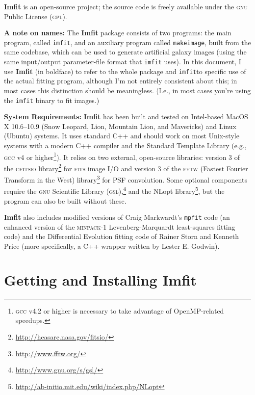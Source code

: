 \documentclass[10pt,a4paper,article]{memoir}
\newcommand{\imfit}{\textbf{Imfit}}
\newcommand{\Imfit}{\textbf{Imfit}}
\newcommand{\imfitprog}{\texttt{imfit}}
\newcommand{\makeimage}{\texttt{makeimage}}
\begin{document}

\Imfit{} is an open-source project; the source code is freely available
under the \textsc{gnu} Public License (\textsc{gpl}).


\textbf{A note on names:} The \imfit{} package consists of two programs:
the main program, called \imfitprog{}, and an auxiliary program called
\makeimage{}, built from the same codebase, which can be used to
generate artificial galaxy images (using the same input/output
parameter-file format that \imfitprog{} uses). In this document, I use
\imfit{} (in boldface) to refer to the whole package and \imfitprog to
specific use of the actual fitting program, although I'm not entirely
consistent about this; in most cases this
distinction should be meaningless. (I.e., in most cases you're using
the \imfitprog{} binary to fit images.)


\bigskip

\textbf{System Requirements:} \Imfit{} has been built and tested on
Intel-based MacOS X 10.6--10.9 (Snow Leopard, Lion, Mountain Lion, and
Mavericks)
and Linux (Ubuntu) systems. It uses standard C++ and should work on most
Unix-style systems with a modern C++ compiler and the Standard Template
Library (e.g., \textsc{gcc} v4 or higher\footnote{\textsc{gcc} v4.2 or
higher is necessary to take advantage of OpenMP-related speedups.}). It
relies on two external, open-source libraries: version 3 of the
\textsc{cfitsio} library\footnote{\url{http://heasarc.nasa.gov/fitsio/}}
for \textsc{fits} image I/O and version 3 of the \textsc{fftw} (Fastest
Fourier Transform in the West)
library\footnote{\url{http://www.fftw.org/}} for PSF convolution. Some
optional components require the \textsc{gnu} Scientific Library
(\textsc{gsl}),\footnote{\url{http://www.gnu.org/s/gsl/}} and the NLopt
library\footnote{\url{http://ab-initio.mit.edu/wiki/index.php/NLopt}},
but the program can also be built without these.

\bigskip

\Imfit{} also includes modified versions of Craig Markwardt's
\texttt{mpfit} code (an enhanced version of the \textsc{minpack-1}
Levenberg-Marquardt least-squares fitting code) and the Differential
Evolution fitting code of Rainer Storn and Kenneth Price (more
specifically, a C++ wrapper written by Lester E. Godwin).



\chapter{Getting and Installing \Imfit{}}
\end{document}
